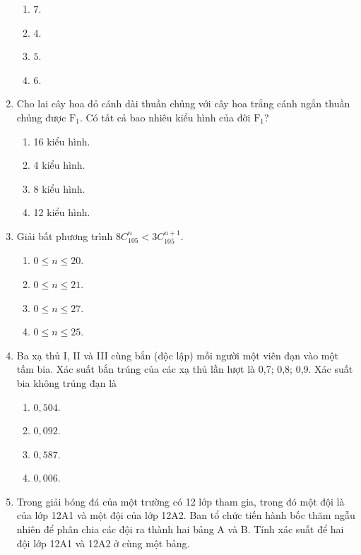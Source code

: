 \begin{enumerate}[label=\textbf{Câu \arabic*.},align=left,left=0cm..0cm,itemindent=*]
	\begin{enumerate}[label=\textbf{\Alph*.},align=left,left=1cm..0cm,itemindent=*]
		\item $7$. \item $4$. \item $5$. \item $6$.
	\end{enumerate}
	\item Cho lai cây hoa đỏ cánh dài thuần chủng với cây hoa trắng cánh ngắn thuần chủng được $\text{F}_1$. Có tất cả bao nhiêu kiểu hình của đời $\text{F}_1$?
	\begin{enumerate}[label=\textbf{\Alph*.},align=left,left=1cm..0cm,itemindent=*]
		\item 16 kiểu hình. \item 4 kiểu hình. \item 8 kiểu hình. \item 12 kiểu hình.
	\end{enumerate}
	\item Giải bất phương trình $8C_{105}^{n}<3C_{105}^{n+1}$.
	\begin{enumerate}[label=\textbf{\Alph*.},align=left,left=1cm..0cm,itemindent=*]
		\item $0\leqslant n\leqslant 20$.
		\item $0\leqslant n\leqslant 21$.
		\item $0\leqslant n\leqslant 27$.
		\item $0\leqslant n\leqslant 25$.
	\end{enumerate}
	\item Ba xạ thủ I, II và III cùng bắn (độc lập) mỗi người một viên đạn vào một tấm bia. Xác suất bắn trúng của các xạ thủ lần lượt là 0,7; 0,8; 0,9. Xác suất bia không trúng đạn là
	\begin{enumerate}[label=\textbf{\Alph*.},align=left,left=1cm..0cm,itemindent=*]
		\item $0,504$. \item $0,092$. \item $0,587$. \item $0,006$.
	\end{enumerate}
	\item Trong giải bóng đá của một trường có 12 lớp tham gia, trong đó một đội là của lớp 12A1 và một đội của lớp 12A2. Ban tổ chức tiến hành bốc thăm ngẫu nhiên để phân chia các đội ra thành hai bảng A và B. Tính xác suất để hai đội lớp 12A1 và 12A2 ở cùng một bảng.
	\begin{enumerate}[label=\textbf{\Alph*.},align=left,left=1cm..0cm,itemindent=*]

\end{enumerate}
\end{enumerate}

